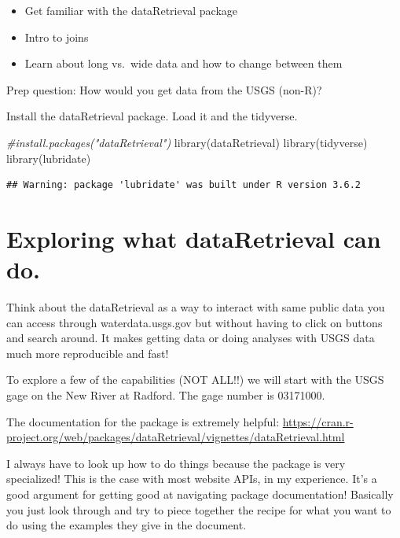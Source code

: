 \documentclass[
]{book}
\newenvironment{Shaded}{\begin{snugshade}}{\end{snugshade}}
\newcommand{\CommentTok}[1]{\textcolor[rgb]{0.56,0.35,0.01}{\textit{#1}}}
\newcommand{\FunctionTok}[1]{\textcolor[rgb]{0.00,0.00,0.00}{#1}}
\newcommand{\NormalTok}[1]{#1}
\providecommand{\tightlist}{%
  \setlength{\itemsep}{0pt}\setlength{\parskip}{0pt}}
\begin{document}
\begin{itemize}
\tightlist
\item
  Get familiar with the dataRetrieval package
\item
  Intro to joins
\item
  Learn about long vs.~wide data and how to change between them
\end{itemize}

Prep question: How would you get data from the USGS (non-R)?

Install the dataRetrieval package. Load it and the tidyverse.

\begin{Shaded}
\begin{Highlighting}[]
\CommentTok{\#install.packages("dataRetrieval")}
\FunctionTok{library}\NormalTok{(dataRetrieval)}
\FunctionTok{library}\NormalTok{(tidyverse)}
\FunctionTok{library}\NormalTok{(lubridate)}
\end{Highlighting}
\end{Shaded}

\begin{verbatim}
## Warning: package 'lubridate' was built under R version 3.6.2
\end{verbatim}

\hypertarget{exploring-what-dataretrieval-can-do.}{%
\section{Exploring what dataRetrieval can do.}\label{exploring-what-dataretrieval-can-do.}}

Think about the dataRetrieval as a way to interact with same public data you can access through waterdata.usgs.gov but without having to click on buttons and search around. It makes getting data or doing analyses with USGS data much more reproducible and fast!

To explore a few of the capabilities (NOT ALL!!) we will start with the USGS gage on the New River at Radford. The gage number is 03171000.

The documentation for the package is extremely helpful: \url{https://cran.r-project.org/web/packages/dataRetrieval/vignettes/dataRetrieval.html}

I always have to look up how to do things because the package is very specialized! This is the case with most website APIs, in my experience. It's a good argument for getting good at navigating package documentation! Basically you just look through and try to piece together the recipe for what you want to do using the examples they give in the document.
\end{document}
